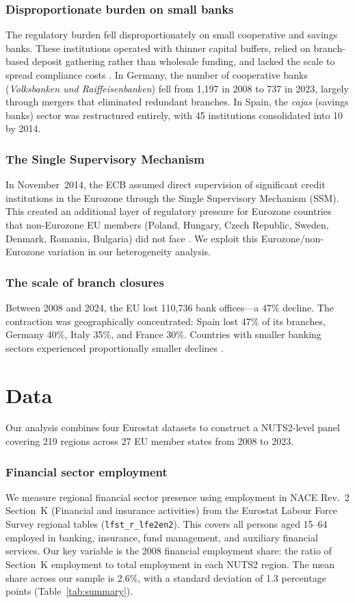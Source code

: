 \documentclass[12pt]{article}
\begin{document}
\subsubsection*{Disproportionate burden on small banks} The regulatory burden fell disproportionately on small cooperative and savings banks. These institutions operated with thinner capital buffers, relied on branch-based deposit gathering rather than wholesale funding, and lacked the scale to spread compliance costs \citep{ecb2024ssi, degroen2019prudreg}. In Germany, the number of cooperative banks (\emph{Volksbanken und Raiffeisenbanken}) fell from 1,197 in 2008 to 737 in 2023, largely through mergers that eliminated redundant branches. In Spain, the \emph{cajas} (savings banks) sector was restructured entirely, with 45 institutions consolidated into 10 by 2014.

\subsubsection*{The Single Supervisory Mechanism} In November~2014, the ECB assumed direct supervision of significant credit institutions in the Eurozone through the Single Supervisory Mechanism (SSM). This created an additional layer of regulatory pressure for Eurozone countries that non-Eurozone EU members (Poland, Hungary, Czech Republic, Sweden, Denmark, Romania, Bulgaria) did not face \citep{ecb2024ssi}. We exploit this Eurozone/non-Eurozone variation in our heterogeneity analysis.

\subsubsection*{The scale of branch closures} Between 2008 and 2024, the EU lost 110,736 bank offices---a 47\% decline. The contraction was geographically concentrated: Spain lost 47\% of its branches, Germany 40\%, Italy 35\%, and France 30\%. Countries with smaller banking sectors experienced proportionally smaller declines \citep{ecb2024ssi}.

\section{Data}

Our analysis combines four Eurostat datasets to construct a NUTS2-level panel covering 219 regions across 27 EU member states from 2008 to 2023.

\subsubsection*{Financial sector employment} We measure regional financial sector presence using employment in NACE Rev.~2 Section~K (Financial and insurance activities) from the Eurostat Labour Force Survey regional tables (\texttt{lfst\_r\_lfe2en2}). This covers all persons aged 15--64 employed in banking, insurance, fund management, and auxiliary financial services. Our key variable is the 2008 financial employment share: the ratio of Section~K employment to total employment in each NUTS2 region. The mean share across our sample is 2.6\%, with a standard deviation of 1.3 percentage points (Table~\ref{tab:summary}).
\end{document}
